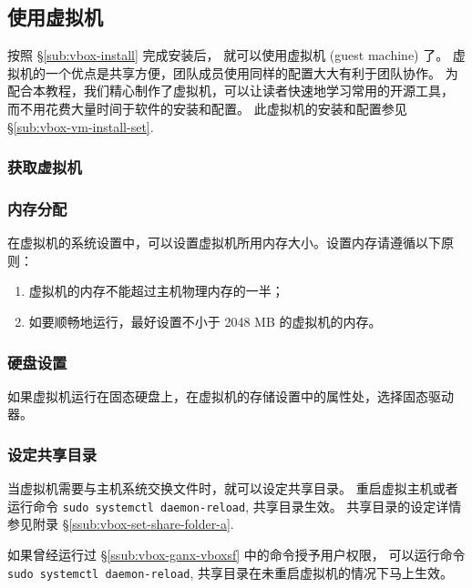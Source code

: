 \documentclass[
    11pt,
    cite=authoryear,
    device=phone,
    lang=cn,
    mode=simple,
    result=answer,
    toc=onecol,
]{elegantbook_sierxue}
\begin{document}
\subsection{使用虚拟机}%
\label{sub:vbox-vm}

按照 \S\ref{sub:vbox-install} 完成安装后，
就可以使用虚拟机 (guest machine) 了。
虚拟机的一个优点是共享方便，团队成员使用同样的配置大大有利于团队协作。
为配合本教程，我们精心制作了虚拟机，可以让读者快速地学习常用的开源工具，
而不用花费大量时间于软件的安装和配置。
此虚拟机的安装和配置参见 \S\ref{sub:vbox-vm-install-set}.

\subsubsection{获取虚拟机}%
\label{ssub:vm-download}

\subsubsection{内存分配}%
\label{ssub:vbox-set-memory}

在虚拟机的系统设置中，可以设置虚拟机所用内存大小。设置内存请遵循以下原则：
\begin{enumerate}
    \item 虚拟机的内存不能超过主机物理内存的一半；
    \item 如要顺畅地运行，最好设置不小于 2048 MB 的虚拟机的内存。
\end{enumerate}

\subsubsection{硬盘设置}%
\label{ssub:vbox-set-vdi}

如果虚拟机运行在固态硬盘上，在虚拟机的存储设置中的属性处，选择固态驱动器。

\subsubsection{设定共享目录}%
\label{ssub:vbox-set-share-folder}

当虚拟机需要与主机系统交换文件时，就可以设定共享目录。
重启虚拟主机或者运行命令 \lstinline{sudo systemctl daemon-reload},
共享目录生效。
共享目录的设定详情参见附录 \S\ref{ssub:vbox-set-share-folder-a}.
\begin{tip}\label{tip:vbox-share-folder-activate}
    如果曾经运行过 \S\ref{ssub:vbox-ganx-vboxsf} 中的命令授予用户权限，
    可以运行命令 \lstinline{sudo systemctl daemon-reload},
    共享目录在未重启虚拟机的情况下马上生效。
\end{tip}
\end{document}
